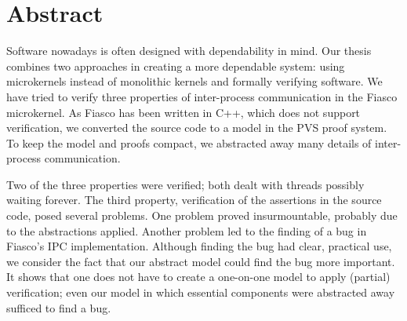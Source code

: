 \chapter*{Abstract}
Software nowadays is often designed with dependability in mind. Our thesis combines two approaches in creating a more dependable system: using microkernels instead of monolithic kernels and formally verifying software. We have tried to verify three properties of inter-process communication in the Fiasco microkernel. As Fiasco has been written in C++, which does not support verification, we converted the source code to a model in the PVS proof system. To keep the model and proofs compact, we abstracted away many details of inter-process communication.\emptyline

Two of the three properties were verified; both dealt with threads possibly waiting forever. The third property, verification of the assertions in the source code, posed several problems. One problem proved insurmountable, probably due to the abstractions applied. Another problem led to the finding of a bug in Fiasco's IPC implementation. Although finding the bug had clear, practical use, we consider the fact that our abstract model could find the bug more important. It shows that one does not have to create a one-on-one model to apply (partial) verification; even our model in which essential components were abstracted away sufficed to find a bug.